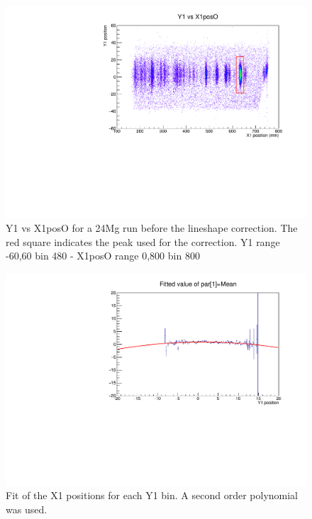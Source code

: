\documentclass[]{report}
\begin{document}
\begin{figure}
	\includegraphics[width=\linewidth]{Figure/run2227-24Mg-lineshape-X1Y1-notcorr.pdf}
	\caption{Y1 vs X1posO for a 24Mg run before the lineshape correction. The red square indicates the peak used for the correction. Y1 range -60,60 bin 480 - X1posO range 0,800 bin 800}
	\label{fig:Y1vsX1_notcorr}
\end{figure}

\begin{figure}
	\includegraphics[width=\linewidth]{Figure/run2227-24Mg-lineshape-X1Y1-fit.pdf}
	\caption{Fit of the X1 positions for each Y1 bin. A second order polynomial was used.}
	\label{fig:Y1vsX1_fit}
\end{figure}
\end{document}
